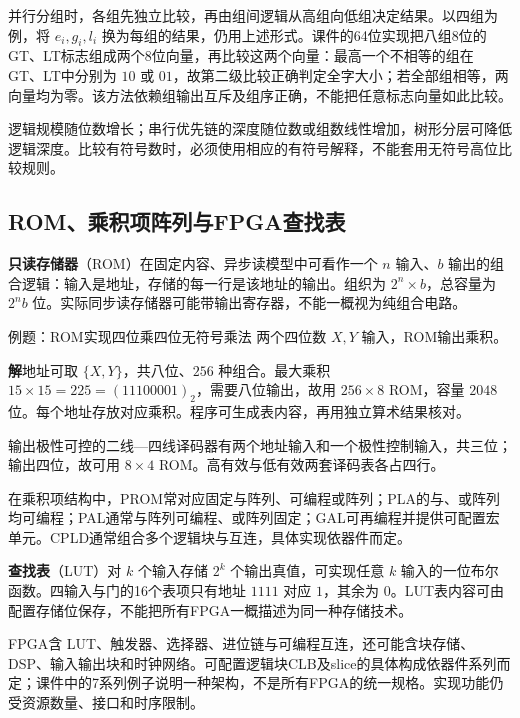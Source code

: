 \documentclass[UTF8,fontset=none,zihao=-4,a4paper]{ctexart}
\newcommand{\term}[1]{\textbf{#1}}
\newcommand{\sol}{\par\noindent\textbf{解}\quad}
\begin{document}
并行分组时，各组先独立比较，再由组间逻辑从高组向低组决定结果。以四组为例，将 $e_i,g_i,l_i$ 换为每组的结果，仍用上述形式。课件的64位实现把八组8位的 GT、LT标志组成两个8位向量，再比较这两个向量：最高一个不相等的组在 GT、LT中分别为 $10$ 或 $01$，故第二级比较正确判定全字大小；若全部组相等，两向量均为零。该方法依赖组输出互斥及组序正确，不能把任意标志向量如此比较。

逻辑规模随位数增长；串行优先链的深度随位数或组数线性增加，树形分层可降低逻辑深度。比较有符号数时，必须使用相应的有符号解释，不能套用无符号高位比较规则。

\subsection{ROM、乘积项阵列与FPGA查找表}
\term{只读存储器}（ROM）在固定内容、异步读模型中可看作一个 $n$ 输入、$b$ 输出的组合逻辑：输入是地址，存储的每一行是该地址的输出。组织为 $2^n\times b$，总容量为 $2^nb$ 位。实际同步读存储器可能带输出寄存器，不能一概视为纯组合电路。
\begin{infobox}{例题：ROM实现四位乘四位无符号乘法}
两个四位数 $X,Y$ 输入，ROM输出乘积。
\end{infobox}
\sol 地址可取 $\{X,Y\}$，共八位、$256$ 种组合。最大乘积 $15\times15=225=(11100001)_2$，需要八位输出，故用 $256\times8$ ROM，容量 $2048$ 位。每个地址存放对应乘积。程序可生成表内容，再用独立算术结果核对。

输出极性可控的二线—四线译码器有两个地址输入和一个极性控制输入，共三位；输出四位，故可用 $8\times4$ ROM。高有效与低有效两套译码表各占四行。

在乘积项结构中，PROM常对应固定与阵列、可编程或阵列；PLA的与、或阵列均可编程；PAL通常与阵列可编程、或阵列固定；GAL可再编程并提供可配置宏单元。CPLD通常组合多个逻辑块与互连，具体实现依器件而定。

\term{查找表}（LUT）对 $k$ 个输入存储 $2^k$ 个输出真值，可实现任意 $k$ 输入的一位布尔函数。四输入与门的16个表项只有地址 $1111$ 对应 $1$，其余为 $0$。LUT表内容可由配置存储位保存，不能把所有FPGA一概描述为同一种存储技术。

FPGA含 LUT、触发器、选择器、进位链与可编程互连，还可能含块存储、DSP、输入输出块和时钟网络。可配置逻辑块CLB及slice的具体构成依器件系列而定；课件中的7系列例子说明一种架构，不是所有FPGA的统一规格。实现功能仍受资源数量、接口和时序限制。

\Needspace{100mm}
\end{document}
